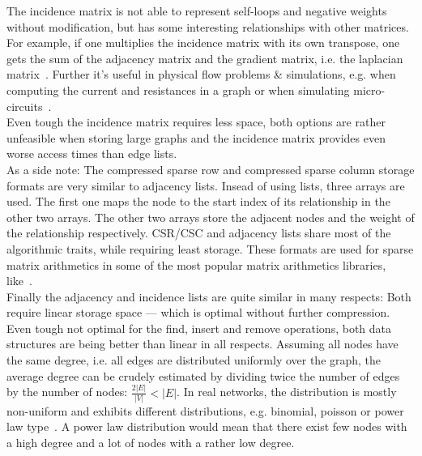         The incidence matrix is not able to represent self-loops and negative weights without modification, but has some interesting relationships with other matrices. 
        For example, if one multiplies the incidence matrix with its own transpose, one gets the sum of the adjacency matrix and the gradient matrix, i.e. the laplacian matrix~\autocite{brouwer2011spectra}. 
        Further it's useful in physical flow problems \& simulations, e.g. when computing the current and resistances in a graph or when simulating micro-circuits~\autocite{weinberg1958kirchhoff}. \\
        
        Even tough the incidence matrix requires less space, both options are rather unfeasible when storing large graphs and the incidence matrix provides even worse access times than edge lists. \\
        
        As a side note: The compressed sparse row and compressed sparse column storage formats are very similar to adjacency lists. 
        Insead of using lists, three arrays are used. 
        The first one maps the node to the start index of its relationship in the other two arrays. 
        The other two arrays store the adjacent nodes and the weight of the relationship respectively. 
        CSR/CSC and adjacency lists share most of the algorithmic traits, while requiring least storage. 
        These formats are used for sparse matrix arithmetics in some of the most popular matrix arithmetics libraries, like~\autocite{MatrixStorageSchemes-2021-03-05, EigenTheMatrixclass-2020-12-05, MatrixStorageSchemes-1999-10-01}.  \\
        
        Finally the adjacency and incidence lists are quite similar in many respects: Both require linear storage space --- which is optimal without further compression. 
        Even tough not optimal for  the find, insert and remove operations, both data structures are being better than linear in all respects. 
        Assuming all nodes have the same degree, i.e. all edges are distributed uniformly over the graph, the average degree can be crudely estimated by dividing twice the number of edges by the number of nodes: $\frac{2|E|}{|V|} < |E|$.
        In real networks, the distribution is mostly non-uniform and exhibits different distributions, e.g. binomial, poisson or power law type~\autocite{holme2019rare}. 
        A power law distribution would mean that there exist few nodes with a high degree and a lot of nodes with a rather low degree. \\
        

